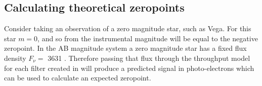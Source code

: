 \begin{colsection}
\begin{colsection}
\end{colsection}

\newpage
\subsection{Calculating theoretical zeropoints}
\label{sec:model_zeropoints}
\begin{colsection}

Consider taking an observation of a zero magnitude star, such as Vega. For this star $m=0$, and so from  the instrumental magnitude will be equal to the negative zeropoint. In the AB magnitude system a zero magnitude star has a fixed flux density $F_\nu = $ \SI{3631}{\jansky} \citep{Sloan_filters}. Therefore passing that flux through the throughput model for each filter created in  will produce a predicted signal in photo-electrons which can be used to calculate an expected zeropoint.


\end{colsection}
\end{colsection}
